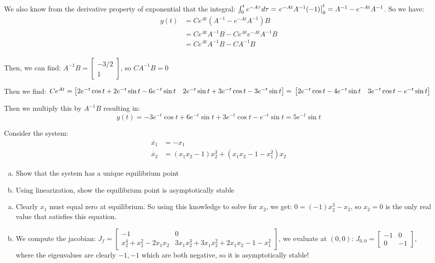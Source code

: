 \documentclass[11pt]{article}
\begin{document}
We also know from the derivative property of exponential that the integral: $\int_0^t e^{-A\tau} d\tau = \left.e^{-At}A^{-1}(-1)\right\rvert_{0}^{t} = A^{-1} - e^{-At}A^{-1}$.
So we have:
\begin{align*}
    y(t) &= Ce^{At} \left( A^{-1} - e^{-At}A^{-1} \right)B\\
    &= Ce^{At}A^{-1}B - Ce^{At}e^{-At}A^{-1}B\\
    &= Ce^{At}A^{-1}B - CA^{-1}B\\
\end{align*}

Then, we can find:
$A^{-1}B = \begin{bmatrix}
    -3/2\\1
\end{bmatrix}$, so $CA^{-1}B = 0$

Then we find:
$Ce^{At} = \begin{bmatrix}
    2e^{-t} \cos t + 2 e^{-t} \sin t - 6e^{-t} \sin t&
    2e^{-t} \sin t + 3e^{-t} \cos t - 3 e^{-t} \sin t
\end{bmatrix} =\\ \begin{bmatrix}
    2e^{-t} \cos t - 4 e^{-t} \sin t&
    3e^{-t} \cos t - e^{-t} \sin t
\end{bmatrix}$

Then we multiply this by $A^{-1}B$ resulting in:
$$
y(t) = -3e^{-t} \cos t + 6 e^{-t} \sin t + 3e^{-t} \cos t - e^{-t} \sin t = 5e^{-t} \sin t
$$

Consider the system:
\begin{align*}
    \dot{x_1} &= -x_1\\
    \dot{x_2} &= (x_1x_2 - 1)x_2^3 + (x_1x_2 - 1 - x_1^2)x_2
\end{align*}

\begin{enumerate}[(a)]
    \item Show that the system has a unique equilibrium point
    \item Using linearization, show the equilibrium point is asymptotically stable
\end{enumerate}
\soln


\begin{enumerate}[(a)]
    \item Clearly $x_1$ must equal zero at equilibrium. So using this knowledge to solve for $x_2$, we get:
    $0 = (-1)x_2^3 -x_2$, so $x_2 = 0$ is the only real value that satisfies this equation.
    \item We compute the jacobian:
    $J_f = \begin{bmatrix}
        -1 & 0 \\ x_2^4 + x_2^2 - 2x_1x_2 & 3x_1x_2^3 + 3x_1x_2^2 + 2x_1x_2 - 1 - x_1^2
    \end{bmatrix}$,
    we evaluate at $(0,0)$:
    $J_{0,0} = \begin{bmatrix}
        -1 & 0 \\ 0 & -1
    \end{bmatrix}$, where the eigenvalues are clearly $-1, -1$ which are both negative, so it is asymptotically stable!

\end{enumerate}
\end{document}
